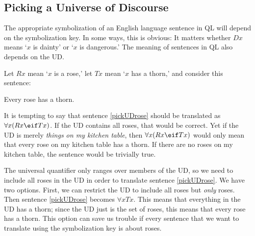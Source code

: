 \begin{table}[h!]
\end{table}

\subsection{Picking a Universe of Discourse}
The appropriate symbolization of an English language sentence in QL will depend on the symbolization key. In some ways, this is obvious: It matters whether $Dx$ means `$x$ is dainty' or `$x$ is dangerous.' The meaning of sentences in QL also depends on the UD.

Let $Rx$ mean `$x$ is a rose,' let $Tx$ mean `$x$ has a thorn,' and consider this sentence:
\begin{earg}
\item[\ex{pickUDrose}] Every rose has a thorn.
\end{earg}

It is tempting to say that sentence \ref{pickUDrose} should be translated as $\forall x(Rx \eif Tx)$. If the UD contains all roses, that would be correct. Yet if the UD is merely \emph{things on my kitchen table}, then $\forall x(Rx \eif Tx)$ would only mean that every rose on my kitchen table has a thorn. If there are no roses on my kitchen table, the sentence would be trivially true.



The universal quantifier only ranges over members of the UD, so we need to include all roses in the UD in order to translate sentence \ref{pickUDrose}. We have two options. First, we can restrict the UD to include all roses but \emph{only} roses. Then sentence \ref{pickUDrose} becomes $\forall x Tx$. This means that everything in the UD has a thorn; since the UD just is the set of roses, this means that every rose has a thorn. This option can save us trouble if every sentence that we want to translate using the symbolization key is about roses.

